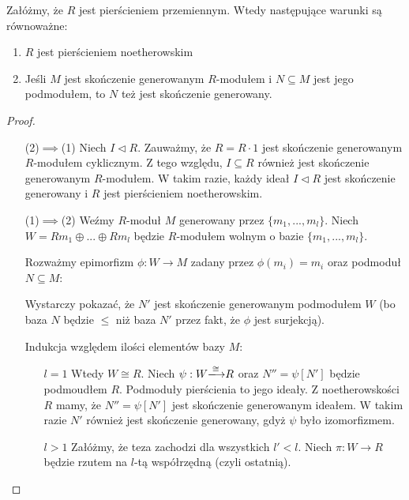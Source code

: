 \begin{conclusion} Załóżmy, że $R$ jest pierścieniem przemiennym. Wtedy następujące warunki są równoważne:

  \begin{enumerate}
    \item $R$ jest pierścieniem noetherowskim
    \item Jeśli $M$ jest skończenie generowanym $R$-modułem i $N\subseteq M$ jest jego podmodułem, to $N$ też jest skończenie generowany. 
  \end{enumerate}
\end{conclusion}

\begin{proof}$ $\newline
  \begin{itemize}[leftmargin=19mm]
    \item[(2)$\implies$(1)] Niech $I\triangleleft R$. Zauważmy, że $R=R\cdot 1$ jest skończenie generowanym $R$-modułem cyklicznym. Z tego względu, $I\subseteq R$ również jest skończenie generowanym $R$-modułem. W takim razie, każdy ideał $I\triangleleft R$ jest skończenie generowany i $R$ jest pierścieniem noetherowskim.
    \item[(1)$\implies$(2)] Weźmy $R$-moduł $M$ generowany przez $\{m_1,...,m_l\}$. Niech $W=Rm_1\oplus ...\oplus Rm_l$ będzie $R$-modułem wolnym o bazie $\{m_1,...,m_l\}$.

      Rozważmy epimorfizm $\phi:W\to M$ zadany przez $\phi(m_i)=m_i$ oraz podmoduł $N\subseteq M$:

      \begin{center}
      \end{center}

      Wystarczy pokazać, że $N'$ jest skończenie generowanym podmodułem $W$ (bo baza $N$ będzie $\leq $ niż baza $N'$ przez fakt, że $\phi$ jest surjekcją).

      Indukcja względem ilości elementów bazy $M$:

      \begin{itemize}
        \item[$l=1$] Wtedy $W\cong R$. Niech $\psi:W\isomorphism R$ oraz $N''=\psi[N']$ będzie podmoudłem $R$. Podmoduły pierścienia to jego ideały. Z noetherowskości $R$ mamy, że $N''=\psi[N']$ jest skończenie generowanym ideałem. W takim razie $N'$ również jest skończenie generowany, gdyż $\psi$ było izomorfizmem.
        \item[$l>1$] Załóżmy, że teza zachodzi dla wszystkich $l'<l$. Niech $\pi:W\to R$ będzie rzutem na $l$-tą współrzędną (czyli ostatnią).


\end{itemize}
\end{itemize}
\end{proof}
